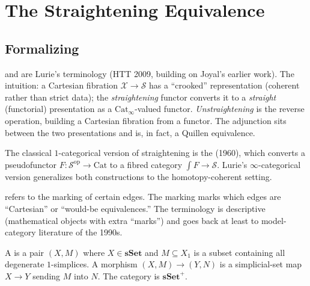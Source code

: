 \section{The Straightening Equivalence}
\label{sec:straightening-statement}

\subsection{Formalizing}

\begin{nameorigin}
 and  are Lurie's terminology
(HTT 2009, building on Joyal's earlier work). The intuition: a Cartesian
fibration $\mathcal{X} \to \mathcal{S}$ has a ``crooked'' representation
(coherent rather than strict data); the \emph{straightening} functor
converts it to a \emph{straight} (functorial) presentation as a
$\mathrm{Cat}_\infty$-valued functor. \emph{Unstraightening} is the
reverse operation, building a Cartesian fibration from a functor. The
adjunction sits between the two presentations and is, in fact, a
Quillen equivalence.

The classical $1$-categorical version of straightening is the
 (1960), which converts a pseudofunctor
$F : \mathcal{S}^{\mathrm{op}} \to \mathrm{Cat}$ to a fibred category
$\int F \to \mathcal{S}$. Lurie's $\infty$-categorical version
generalizes both constructions to the homotopy-coherent setting.
\end{nameorigin}

\begin{nameorigin}
 refers to the marking of certain edges.
The marking marks which edges are ``Cartesian'' or ``would-be
equivalences.'' The terminology is descriptive (mathematical objects
with extra ``marks'') and goes back at least to model-category
literature of the 1990s.
\end{nameorigin}

\begin{definition}
\label{def:marked-sset}
A  is a pair $(X, M)$ where $X \in \mathbf{sSet}$
and $M \subseteq X_1$ is a subset containing all degenerate $1$-simplices.
A morphism $(X, M) \to (Y, N)$ is a simplicial-set map $X \to Y$ sending
$M$ into $N$. The category is $\mathbf{sSet}^+$.
\end{definition}


